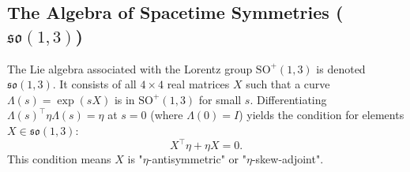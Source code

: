 \documentclass{amsart}
\theoremstyle{definition}
\theoremstyle{remark}
\begin{document}
\subsection{The Algebra of Spacetime Symmetries ($\mathfrak{so}(1,3)$)}
\label{subsec:so13_algebra}
The Lie algebra associated with the Lorentz group $\mathrm{SO}^+(1,3)$ is denoted $\mathfrak{so}(1,3)$. It consists of all \(4 \times 4\) real matrices \(X\) such that a curve $\Lambda(s) = \exp(sX)$ is in $\mathrm{SO}^+(1,3)$ for small $s$. Differentiating $\Lambda(s)^\top \eta \Lambda(s) = \eta$ at $s=0$ (where $\Lambda(0)=I$) yields the condition for elements $X \in \mathfrak{so}(1,3)$:
\begin{equation*}
  X^\top \eta + \eta X = 0.
\end{equation*}
This condition means $X$ is "$\eta$-antisymmetric" or "$\eta$-skew-adjoint".
\end{document}
